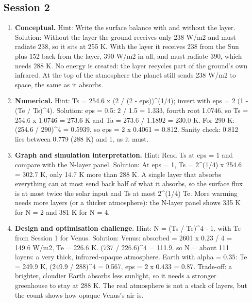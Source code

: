 \documentclass[11pt,a4paper]{article}
\begin{document}
\subsection*{Session 2}
\begin{enumerate}[nosep]
\item \textbf{Conceptual.} Hint: Write the surface balance with and without the layer. Solution: Without the layer the ground receives only 238 W/m2 and must radiate 238, so it sits at 255 K. With the layer it receives 238 from the Sun plus 152 back from the layer, 390 W/m2 in all, and must radiate 390, which needs 288 K. No energy is created: the layer recycles part of the ground's own infrared. At the top of the atmosphere the planet still sends 238 W/m2 to space, the same as it absorbs.
\item \textbf{Numerical.} Hint: Ts = 254.6 x (2 / (2 - eps))\textasciicircum{}(1/4); invert with eps = 2 (1 - (Te / Ts)\textasciicircum{}4). Solution: eps = 0.5: 2 / 1.5 = 1.333, fourth root 1.0746, so Ts = 254.6 x 1.0746 = 273.6 K and Ta = 273.6 / 1.1892 = 230.0 K. For 290 K: (254.6 / 290)\textasciicircum{}4 = 0.5939, so eps = 2 x 0.4061 = 0.812. Sanity check: 0.812 lies between 0.779 (288 K) and 1, as it must.
\item \textbf{Graph and simulation interpretation.} Hint: Read Ts at eps = 1 and compare with the N-layer panel. Solution: At eps = 1, Ts = 2\textasciicircum{}(1/4) x 254.6 = 302.7 K, only 14.7 K more than 288 K. A single layer that absorbs everything can at most send back half of what it absorbs, so the surface flux is at most twice the solar input and Ts at most 2\textasciicircum{}(1/4) Te. More warming needs more layers (or a thicker atmosphere): the N-layer panel shows 335 K for N = 2 and 381 K for N = 4.
\item \textbf{Design and optimisation challenge.} Hint: N = (Ts / Te)\textasciicircum{}4 - 1, with Te from Session 1 for Venus. Solution: Venus: absorbed = 2601 x 0.23 / 4 = 149.6 W/m2, Te = 226.6 K. (737 / 226.6)\textasciicircum{}4 = 111.9, so N = about 111 layers: a very thick, infrared-opaque atmosphere. Earth with alpha = 0.35: Te = 249.9 K, (249.9 / 288)\textasciicircum{}4 = 0.567, eps = 2 x 0.433 = 0.87. Trade-off: a brighter, cloudier Earth absorbs less sunlight, so it needs a stronger greenhouse to stay at 288 K. The real atmosphere is not a stack of layers, but the count shows how opaque Venus's air is.
\end{enumerate}
\end{document}
